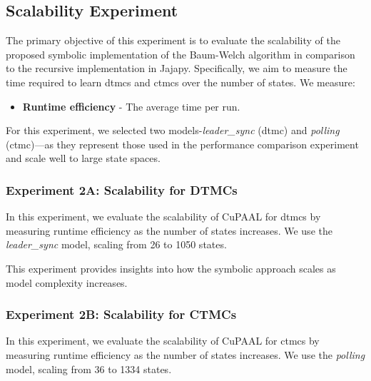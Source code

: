 \subsection{Scalability Experiment}
The primary objective of this experiment is to evaluate the scalability of the proposed symbolic implementation of the Baum-Welch algorithm in comparison to the recursive implementation in Jajapy.
Specifically, we aim to measure the time required to learn \glspl{dtmc} and \glspl{ctmc} over the number of states.
We measure:
\begin{itemize}
    \item \textbf{Runtime efficiency} - The average time per run.
\end{itemize}

For this experiment, we selected two models-\textit{leader\_sync} (\gls{dtmc}) and \textit{polling} (\gls{ctmc})—as they represent those used in the performance comparison experiment and scale well to large state spaces.

\subsubsection{Experiment 2A: Scalability for DTMCs}
In this experiment, we evaluate the scalability of CuPAAL for \glspl{dtmc} by measuring runtime efficiency as the number of states increases.
We use the \textit{leader\_sync} model, scaling from 26 to 1050 states.

This experiment provides insights into how the symbolic approach scales as model complexity increases.


\subsubsection{Experiment 2B: Scalability for CTMCs}
In this experiment, we evaluate the scalability of CuPAAL for \glspl{ctmc} by measuring runtime efficiency as the number of states increases.
We use the \textit{polling} model, scaling from 36 to 1334 states.

